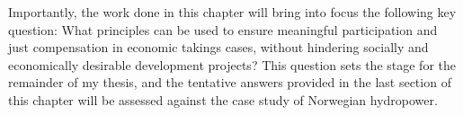 
Importantly, the work done in this chapter will bring into focus the following key question: What principles can be used to ensure meaningful participation and just compensation in economic takings cases, without hindering socially and economically desirable development projects? This question sets the stage for the remainder of my thesis, and the tentative answers provided in the last section of this chapter will be assessed against the case study of Norwegian hydropower.




